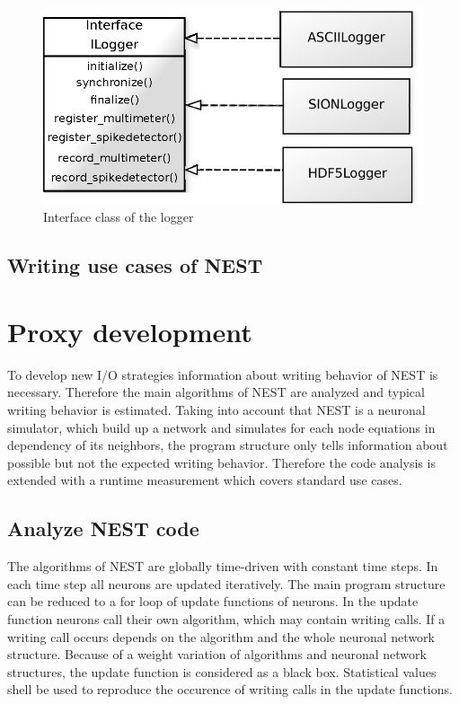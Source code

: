 \documentclass[]{YIC2015}
\begin{document}
\begin{figure}[htbp]
\centering %
\includegraphics[scale=0.5]{loggerinterface.eps}
\caption{Interface class of the logger}
\label{fig:loggerinterface}
\end{figure}


\subsection{Writing use cases of NEST}


\section{Proxy development}
To develop new I/O strategies information about writing behavior of NEST is necessary.
Therefore the main algorithms of NEST are analyzed and typical writing behavior is estimated.
Taking into account that NEST is a neuronal simulator,
which build up a network and simulates for each  node equations in dependency of its neighbors,
the program structure only tells information about possible but not the expected writing behavior.
Therefore the code analysis is extended with a runtime measurement which covers standard use cases.


\subsection{Analyze NEST code}
The algorithms of NEST are globally time-driven with constant time steps.
In each time step all neurons are updated iteratively.
The main program structure can be reduced to a for loop of update functions of neurons.
In the update function neurons call their own algorithm, which may contain writing calls.
If a writing call occurs depends on the algorithm and the whole neuronal network structure.
Because of a weight variation of algorithms and neuronal network structures, the update function is considered as a black box.
Statistical values shell be used to reproduce the occurence of writing calls in the update functions.
\end{document}
